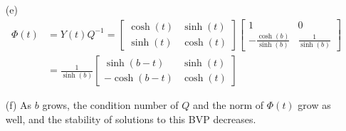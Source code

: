 \begin{sol}
\begin{itemize}
  \item[(e)]
    \begin{align*}
      \Phi(t) &= Y(t)Q^{-1} =
      \begin{bmatrix}
        \cosh(t) & \sinh(t) \\
        \sinh(t) & \cosh(t)
      \end{bmatrix}
                   \begin{bmatrix}
                     1 & 0 \\
                     -\frac{\cosh(b)}{\sinh(b)} & \frac{1}{\sinh(b)}
                   \end{bmatrix} \\
      &= \frac{1}{\sinh(b)}
        \begin{bmatrix}
          \sinh(b-t) & \sinh(t) \\
          -\cosh(b-t) & \cosh(t)
        \end{bmatrix}
    \end{align*}

  \item[(f)]
    As $b$ grows,
    the condition number of $Q$ and the norm of $\Phi(t)$ grow as well,
    and the stability of solutions to this BVP decreases.
  \end{itemize}
\end{sol}
